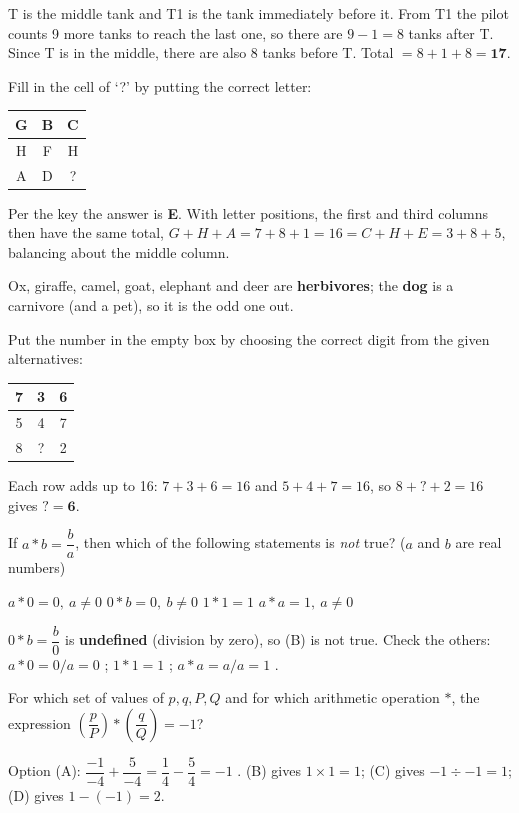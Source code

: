 T is the middle tank and T1 is the tank immediately before it. From T1 the pilot counts 9 more tanks to reach the last one, so there are $9-1=8$ tanks after T. Since T is in the middle, there are also 8 tanks before T.
Total $=8+1+8=\mathbf{17}$.

Fill in the cell of `?' by putting the correct letter:\\[3pt]
\centering\begin{tabular}{|c|c|c|}\hline G & B & C\\\hline H & F & H\\\hline A & D & ?\\\hline\end{tabular}

Per the key the answer is \textbf{E}. With letter positions, the first and third columns then have the same total, $G+H+A=7+8+1=16=C+H+E=3+8+5$, balancing about the middle column.

Ox, giraffe, camel, goat, elephant and deer are \textbf{herbivores}; the \textbf{dog} is a carnivore (and a pet), so it is the odd one out.

Put the number in the empty box by choosing the correct digit from the given alternatives:\\[3pt]
\centering\begin{tabular}{|c|c|c|}\hline 7 & 3 & 6\\\hline 5 & 4 & 7\\\hline 8 & ? & 2\\\hline\end{tabular}

Each row adds up to 16: $7+3+6=16$ and $5+4+7=16$, so $8+?+2=16$ gives $?=\mathbf{6}$.

If $a*b=\dfrac{b}{a}$, then which of the following statements is \emph{not} true? ($a$ and $b$ are real numbers)

$a*0=0,\ a\neq0$
$0*b=0,\ b\neq0$
$1*1=1$
$a*a=1,\ a\neq0$

$0*b=\dfrac{b}{0}$ is \textbf{undefined} (division by zero), so (B) is not true.
Check the others: $a*0=0/a=0$ \checkmark; $1*1=1$ \checkmark; $a*a=a/a=1$ \checkmark.

For which set of values of $p, q, P, Q$ and for which arithmetic operation $*$, the expression $\left(\dfrac{p}{P}\right)*\left(\dfrac{q}{Q}\right)=-1$?

Option (A): $\dfrac{-1}{-4}+\dfrac{5}{-4}=\dfrac14-\dfrac54=-1$ \checkmark.
(B) gives $1\times1=1$; (C) gives $-1\div-1=1$; (D) gives $1-(-1)=2$.

